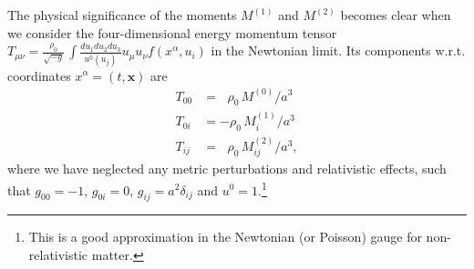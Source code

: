 \documentclass[twocolumn, nofootinbib, showpacs, superscriptaddress]{revtex4-1}
\newcommand{\vx}[0]{\bm{x} }
\begin{document}
The physical significance of the moments $M^{(1)}$ and $M^{(2)}$ becomes clear when we consider the four-dimensional energy momentum tensor 
$T_{\mu \nu}=\frac{ \rho_0}{\sqrt{-g}}\, \int  \frac{du_1 du_2 du_3}{ u^0(u_j)} u_\mu u_\nu f(x^\alpha,u_{i})$ in the Newtonian limit. Its components w.r.t. coordinates $x^\alpha=(t,\vx)$ are 
\begin{subequations} \label{EMtensor}
\begin{align}
T_{00} &=\ \ \, \rho_0 \, M^{(0)}/a^3 \\
T_{0i} &= - \rho_0\, M^{(1)}_i /a^3 \\
T_{ij} &= \ \ \,\rho_0\, M^{(2)}_{i j} /a^3, \label{stresstensor}
\end{align}
\end{subequations}
where we have neglected any metric perturbations and relativistic effects, such that $g_{00}=-1$, $g_{0i} =0$, $g_{ij}= a^2 \delta_{ij}$ and $u^0=1$.\footnote{This is a good approximation in the Newtonian (or Poisson) gauge for non-relativistic matter.}
\end{document}
